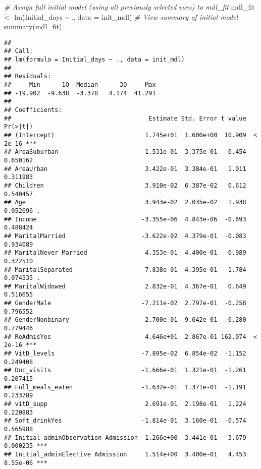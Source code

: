 \documentclass[
]{article}
\newenvironment{Shaded}{\begin{snugshade}}{\end{snugshade}}
\newcommand{\AttributeTok}[1]{\textcolor[rgb]{0.77,0.63,0.00}{#1}}
\newcommand{\CommentTok}[1]{\textcolor[rgb]{0.56,0.35,0.01}{\textit{#1}}}
\newcommand{\FunctionTok}[1]{\textcolor[rgb]{0.00,0.00,0.00}{#1}}
\newcommand{\NormalTok}[1]{#1}
\newcommand{\OtherTok}[1]{\textcolor[rgb]{0.56,0.35,0.01}{#1}}
\newcommand{\SpecialCharTok}[1]{\textcolor[rgb]{0.00,0.00,0.00}{#1}}
\begin{document}
\begin{Shaded}
\begin{Highlighting}[]
\CommentTok{\# Assign full initial model (using all previously selected vars) to mdl\_fit}
\NormalTok{mdl\_fit }\OtherTok{\textless{}{-}} \FunctionTok{lm}\NormalTok{(Initial\_days }\SpecialCharTok{\textasciitilde{}}\NormalTok{ .,}
              \AttributeTok{data =}\NormalTok{ init\_mdl)}
\CommentTok{\# View summary of initial model}
\FunctionTok{summary}\NormalTok{(mdl\_fit)}
\end{Highlighting}
\end{Shaded}

\begin{verbatim}
## 
## Call:
## lm(formula = Initial_days ~ ., data = init_mdl)
## 
## Residuals:
##     Min      1Q  Median      3Q     Max 
## -19.902  -9.638  -3.378   4.174  41.291 
## 
## Coefficients:
##                                      Estimate Std. Error t value Pr(>|t|)    
## (Intercept)                         1.745e+01  1.600e+00  10.909  < 2e-16 ***
## AreaSuburban                        1.531e-01  3.375e-01   0.454 0.650162    
## AreaUrban                           3.422e-01  3.384e-01   1.011 0.311983    
## Children                            3.910e-02  6.387e-02   0.612 0.540457    
## Age                                 3.943e-02  2.035e-02   1.938 0.052696 .  
## Income                             -3.355e-06  4.843e-06  -0.693 0.488424    
## MaritalMarried                     -3.622e-02  4.379e-01  -0.083 0.934089    
## MaritalNever Married                4.353e-01  4.400e-01   0.989 0.322510    
## MaritalSeparated                    7.838e-01  4.395e-01   1.784 0.074535 .  
## MaritalWidowed                      2.832e-01  4.367e-01   0.649 0.516655    
## GenderMale                         -7.211e-02  2.797e-01  -0.258 0.796552    
## GenderNonbinary                    -2.700e-01  9.642e-01  -0.280 0.779446    
## ReAdmisYes                          4.646e+01  2.867e-01 162.074  < 2e-16 ***
## VitD_levels                        -7.895e-02  6.854e-02  -1.152 0.249408    
## Doc_visits                         -1.666e-01  1.321e-01  -1.261 0.207415    
## Full_meals_eaten                   -1.632e-01  1.371e-01  -1.191 0.233789    
## vitD_supp                           2.691e-01  2.198e-01   1.224 0.220883    
## Soft_drinkYes                      -1.814e-01  3.160e-01  -0.574 0.565988    
## Initial_adminObservation Admission  1.266e+00  3.441e-01   3.679 0.000235 ***
## Initial_adminElective Admission     1.514e+00  3.400e-01   4.453 8.55e-06 ***

\end{verbatim}
\end{document}
